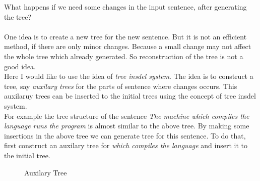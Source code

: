What happens if we need some changes in the input sentence, after generating the tree?\\\\
One idea is to create a new tree for the new sentence. But it is not an efficient method, if there are only minor changes.
Because a small change may not affect the whole tree which already generated. So reconstruction of the tree is not a good idea.\\
Here I would like to use the idea of \emph{tree insdel system}. The idea is to construct a tree, say 
\emph{auxilary trees} for the parts of sentence where changes occurs. This auxilaruy trees can be inserted to the initial trees
 using the concept of tree insdel system.\\
For example the tree structure of the sentence \emph{The machine which compiles the language runs the program} is almost similar 
to the above tree. By making some insertions in the above tree we can generate tree for this sentence. To do that, first 
construct an auxilary tree for \emph{which compiles the language} and insert it to the initial tree.
\begin{figure}[h]
\begin{center}
{\tiny
{
	{
		{
		}
	}
	{
		{
		}					
		{
			{
			}
			{
			}
		}
	}
}
\label{fig3}
\caption{Auxilary Tree}
}
\end{center}
\end{figure}

